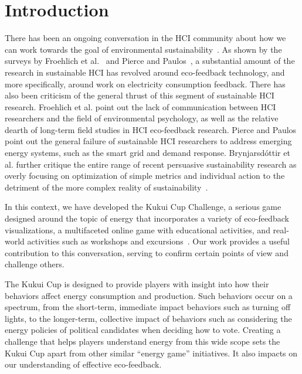 \documentclass{sigchi}
\begin{document}

\section{Introduction}

There has been an ongoing conversation in the HCI community about how we can work towards the goal of environmental sustainability~\cite{Blevis2007-SID, Woodruff2008-bright-green}. As shown by the surveys by Froehlich et al.~\cite{Froehlich2010} and Pierce and Paulos~\cite{Pierce2012-BEM}, a substantial amount of the research in sustainable HCI has revolved around eco-feedback technology, and more specifically, around work on electricity consumption feedback. There has also been criticism of the general thrust of this segment of sustainable HCI research. Froehlich et al. point out the lack of communication between HCI researchers and the field of environmental psychology, as well as the relative dearth of long-term field studies in HCI eco-feedback research. Pierce and Paulos point out the general failure of sustainable HCI researchers to address emerging energy systems, such as the smart grid and demand response. Brynjarsd\'{o}ttir et al. further critique the entire range of recent persuasive sustainability research as overly focusing on optimization of simple metrics and individual action to the detriment of the more complex reality of sustainability~\cite{Brynjarsdottir2012-unpersuaded}.

In this context, we have developed the Kukui Cup Challenge, a serious game~\cite{Zyda2005} designed around the topic of energy that incorporates a variety of eco-feedback visualizations, a multifaceted online game with educational activities, and real-world activities such as workshops and excursions~\cite{csdl2-10-07}. Our work provides a useful contribution to this conversation, serving to confirm certain points of view and challenge others.

The Kukui Cup is designed to provide players with insight into how their behaviors affect energy consumption and production. Such behaviors occur on a spectrum, from the short-term, immediate impact behaviors such as turning off lights, to the longer-term, collective impact of behaviors such as considering the energy policies of political candidates when deciding how to vote. Creating a challenge that helps players understand energy from this wide scope sets the Kukui Cup apart from other similar ``energy game'' initiatives. It also impacts on our understanding of effective eco-feedback.
\end{document}
